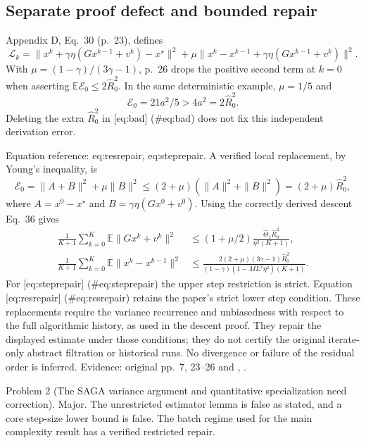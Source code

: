 \documentclass[10pt]{article}
\begin{document}
\subsection*{Separate proof defect and bounded repair}
Appendix D, Eq. 30 (p. 23), defines \[\mathcal L_k=\|x^k+\gamma\eta(Gx^{k-1}+v^k)-x^\star\|^2
 +\mu\|x^k-x^{k-1}+\gamma\eta(Gx^{k-1}+v^k)\|^2.\] With \(\mu=(1-\gamma)/(3\gamma-1)\), p. 26 drops the positive second term at \(k=0\) when asserting \(\mathbb E\mathcal E_0\le2\widehat R_0^2\). In the same deterministic example, \(\mu=1/5\) and \[\mathcal E_0=21a^2/5>4a^2=2\widehat R_0^2.\] Deleting the extra \(\widehat R_0^2\) in [eq:bad] (\#eq:bad) does not fix this independent derivation error.\par
Equation reference: eq:resrepair, eq:steprepair. A verified local replacement, by Young’s inequality, is \[\mathcal E_0=\|A+B\|^2+\mu\|B\|^2
 \le(2+\mu)(\|A\|^2+\|B\|^2)=(2+\mu)\widehat R_0^2,\] where \(A=x^0-x^\star\) and \(B=\gamma\eta(Gx^0+v^0)\). Using the correctly derived descent Eq. 36 gives \[\begin{aligned}
 \frac1{K+1}\sum_{k=0}^K\mathbb E\|Gx^k+v^k\|^2
 &\le(1+\mu/2)\frac{\widehat\Theta_1\widehat R_0^2}
 {\eta^2(K+1)},\\
 \frac1{K+1}\sum_{k=0}^K\mathbb E\|x^k-x^{k-1}\|^2
 &\le\frac{2(2+\mu)(3\gamma-1)\widehat R_0^2}
 {(1-\gamma)(1-ML^2\eta^2)(K+1)}.\end{aligned}\] For [eq:steprepair] (\#eq:steprepair) the upper step restriction is strict. Equation [eq:resrepair] (\#eq:resrepair) retains the paper’s strict lower step condition. These replacements require the variance recurrence and unbiasedness with respect to the full algorithmic history, as used in the descent proof. They repair the displayed estimate under those conditions; they do not certify the original iterate-only abstract filtration or historical runs. No divergence or failure of the residual order is inferred. Evidence: original pp. 7, 23–26 and , .\par
Problem 2 (The SAGA variance argument and quantitative specialization need correction).  Major. The unrestricted estimator lemma is false as stated, and a core step-size lower bound is false. The batch regime used for the main complexity result has a verified restricted repair.\par
\end{document}
